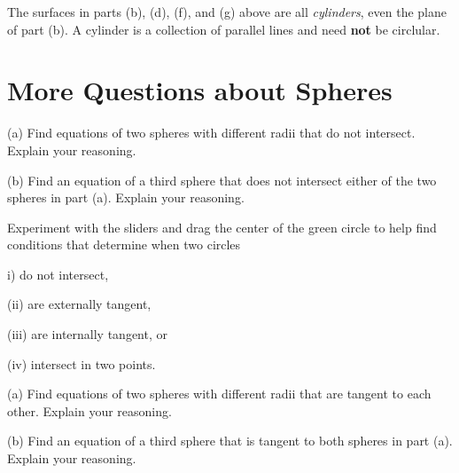 \documentclass{ximera}
\begin{document}
The surfaces in parts (b), (d), (f), and (g) above are all \emph{cylinders}, even the plane of part (b). A cylinder is a collection of parallel lines and need {\bf not} be circlular.


\section*{More Questions about Spheres}


\begin{question} \label{Q522:Coordinates}
(a) Find equations of two spheres with different radii that do not intersect. Explain your reasoning.

(b) Find an equation of a third sphere that does not intersect either of the two spheres in part (a). Explain your reasoning.


\begin{hint}
Experiment with the sliders and drag the center of the green circle to help find conditions that determine when two circles 

i) do not intersect,

(ii) are externally tangent,

(iii) are internally tangent, or

(iv) intersect in two points.

 
\begin{onlineOnly}
    \begin{center}
\end{center}
\end{onlineOnly}
\end{hint}




\end{question}





\begin{question} \label{Q52:Coordinates}
(a) Find equations of two spheres with different radii that are tangent to each other. Explain your reasoning.

(b) Find an equation of a third sphere that is tangent to both spheres in part (a). Explain your reasoning.
\end{question}
\end{document}
